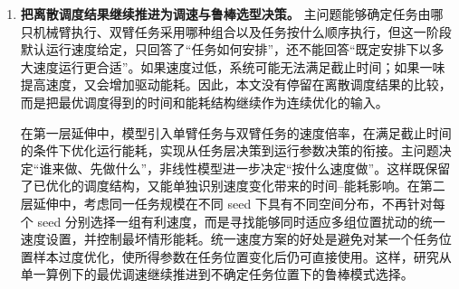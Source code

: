 \begin{enumerate}
这里的“预测”不是猜测未来任务的具体排法，而是计算一个偏乐观的理论下界。真实后续调度只可能等于或差于该下界，因此只有当这个最好可能结果都无法优于当前完整解时，分支才会被剪去，不会因此误删潜在最优解。这种前瞻评价使算法既能提前减少候选数量，又保留精确搜索的最优性保证，是融合剪枝隐枚举法区别于直接枚举的重要设计。

热启动进一步放大了前瞻预测的作用。启发式算法先快速给出较好的完整可行解，其字典序目标值成为初始上界，于是前瞻下界从搜索开始就有明确的比较对象。启发式负责“尽早给出好上界”，隐枚举负责“利用下界排除不可能更优的分支并完成最优性证明”，形成“先快速找到较好解，再围绕较好解进行精确搜索”的过程。隐枚举仍从空调度开始，不改变可行域、安全下界或状态支配规则，所以启发式解不再只是近似答案，而被转化为精确搜索的剪枝依据；搜索完成后，最优性仍由完整分支定界保证。由此，热启动隐枚举不仅用于改进启发式解，也能够反过来判定启发式是否已经达到最优目标值。

在本文算例中，热启动后的隐枚举方法平均快于 CP-SAT，正是因为前瞻预测、问题专用下界和紧初始上界共同减少了实际展开的分支。CP-SAT 则需要将同一结构转换为通用可选区间、回路和逻辑约束，并分阶段处理三级目标。实验中热启动隐枚举平均用时为 $6.0634$ s，低于 CP-SAT 的 $7.2631$ s，且 16 种任务组合的最优目标值完全一致。这里的优势来自本文问题结构与算例规模，不能外推为自编算法在任意规模下都快于通用求解器。

\textbf{启发式最优性}采用内部证明与外部对照两种方式判断。内部证明来自热启动隐枚举：程序分别保留启发式初始目标值和隐枚举完成后的最优目标值；若两者一致，说明完整搜索没有发现任何更优分支，启发式已经达到该算例的字典序最优目标；若最终目标值更优，则说明启发式只是近似解，而隐枚举完成了改进。外部对照则使用 CP-SAT 已证明的最优结果，按照最大完工时间、总能耗和负载差的优先级依次比较。两种验证相互补充：隐枚举给出自编算法内部的最优性证明，CP-SAT 提供独立求解器的交叉检查。实验据此统计最优命中率、目标差距和计算时间，二臂场景有 $44/48$ 组启发式解达到最优，三臂场景有 $23/48$ 组达到最优。

	\item \textbf{把离散调度结果继续推进为调速与鲁棒选型决策。}
主问题能够确定任务由哪只机械臂执行、双臂任务采用哪种组合以及任务按什么顺序执行，但这一阶段默认运行速度给定，只回答了“任务如何安排”，还不能回答“既定安排下以多大速度运行更合适”。如果速度过低，系统可能无法满足截止时间；如果一味提高速度，又会增加驱动能耗。因此，本文没有停留在离散调度结果的比较，而是把最优调度得到的时间和能耗结构继续作为连续优化的输入。

在第一层延伸中，模型引入单臂任务与双臂任务的速度倍率，在满足截止时间的条件下优化运行能耗，实现从任务层决策到运行参数决策的衔接。主问题决定“谁来做、先做什么”，非线性模型进一步决定“按什么速度做”。这样既保留了已优化的调度结构，又能单独识别速度变化带来的时间--能耗影响。在第二层延伸中，考虑同一任务规模在不同 seed 下具有不同空间分布，不再针对每个 seed 分别选择一组有利速度，而是寻找能够同时适应多组位置扰动的统一速度设置，并控制最坏情形能耗。统一速度方案的好处是避免对某一个任务位置样本过度优化，使所得参数在任务位置变化后仍可直接使用。这样，研究从单一算例下的最优调速继续推进到不确定任务位置下的鲁棒模式选择。


\end{enumerate}
